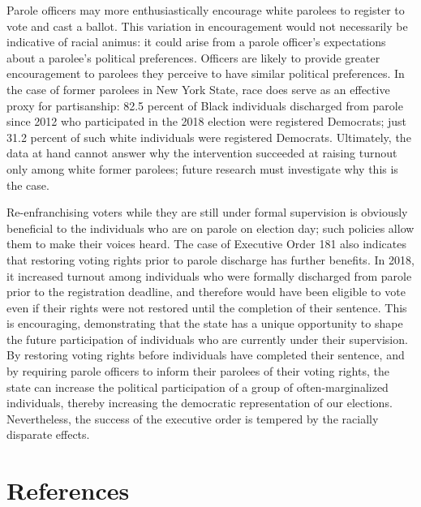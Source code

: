 \documentclass[
  12pt,
]{article}
\begin{document}
Parole officers may more enthusiastically encourage white parolees to register to vote and cast a ballot. This variation in encouragement would not necessarily be indicative of racial animus: it could arise from a parole officer's expectations about a parolee's political preferences. Officers are likely to provide greater encouragement to parolees they perceive to have similar political preferences. In the case of former parolees in New York State, race does serve as an effective proxy for partisanship: 82.5 percent of Black individuals discharged from parole since 2012 who participated in the 2018 election were registered Democrats; just 31.2 percent of such white individuals were registered Democrats. Ultimately, the data at hand cannot answer why the intervention succeeded at raising turnout only among white former parolees; future research must investigate why this is the case.

Re-enfranchising voters while they are still under formal supervision is obviously beneficial to the individuals who are on parole on election day; such policies allow them to make their voices heard. The case of Executive Order 181 also indicates that restoring voting rights prior to parole discharge has further benefits. In 2018, it increased turnout among individuals who were formally discharged from parole prior to the registration deadline, and therefore would have been eligible to vote even if their rights were not restored until the completion of their sentence. This is encouraging, demonstrating that the state has a unique opportunity to shape the future participation of individuals who are currently under their supervision. By restoring voting rights before individuals have completed their sentence, and by requiring parole officers to inform their parolees of their voting rights, the state can increase the political participation of a group of often-marginalized individuals, thereby increasing the democratic representation of our elections. Nevertheless, the success of the executive order is tempered by the racially disparate effects.

\newpage

\hypertarget{references}{%
\section*{References}\label{references}}
\end{document}
